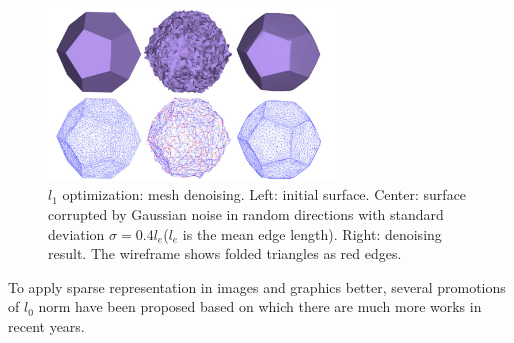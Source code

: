 \begin{figure}[ht]
  \centering
  \includegraphics[width=3in]{images/denoise_L0}
  \caption{$l_1$ optimization: mesh denoising\cite{he2013mesh}. Left: initial surface. Center: surface corrupted by Gaussian noise in random directions with standard deviation $\sigma=0.4l_{e}$($l_{e}$ is the mean edge length). Right: denoising result. The wireframe shows folded triangles as red edges.}
\end{figure}

To apply sparse representation in images and graphics better, several promotions of $l_0$ norm have been proposed based on which there are much more works in recent years.






